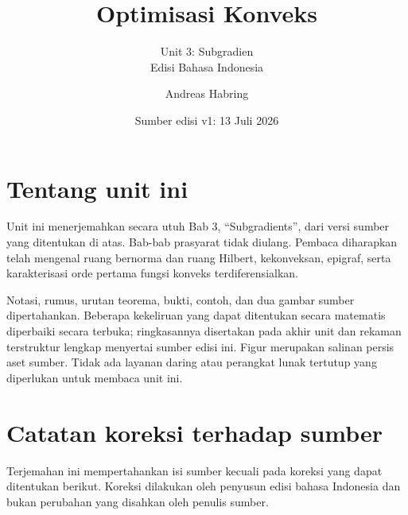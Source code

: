 \documentclass[indonesian]{shinybook}
\title{Optimisasi Konveks}
\subtitle{Unit 3: Subgradien\\Edisi Bahasa Indonesia}
\author{Andreas Habring}
\date{Sumber edisi v1: 13 Juli 2026}
\begin{document}
\maketitle

\frontmatter
\chapter*{Tentang unit ini}
Unit ini menerjemahkan secara utuh Bab 3, ``Subgradients'', dari versi sumber yang ditentukan di atas. Bab-bab prasyarat tidak diulang. Pembaca diharapkan telah mengenal ruang bernorma dan ruang Hilbert, kekonveksan, epigraf, serta karakterisasi orde pertama fungsi konveks terdiferensialkan.

Notasi, rumus, urutan teorema, bukti, contoh, dan dua gambar sumber dipertahankan. Beberapa kekeliruan yang dapat ditentukan secara matematis diperbaiki secara terbuka; ringkasannya disertakan pada akhir unit dan rekaman terstruktur lengkap menyertai sumber edisi ini. Figur merupakan salinan persis aset sumber. Tidak ada layanan daring atau perangkat lunak tertutup yang diperlukan untuk membaca unit ini.

\tableofcontents
\mainmatter
\setcounter{chapter}{2}


\backmatter
\chapter*{Catatan koreksi terhadap sumber}
Terjemahan ini mempertahankan isi sumber kecuali pada koreksi yang dapat ditentukan berikut. Koreksi dilakukan oleh penyusun edisi bahasa Indonesia dan bukan perubahan yang disahkan oleh penulis sumber.
\end{document}
